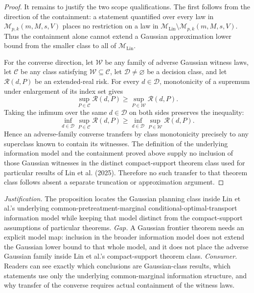\documentclass{article}
\begin{document}
\begin{proof}
It remains to justify the two scope qualifications.  The first follows
from the direction of the containment: a statement quantified over every
law in \(\mathcal M_{p,k}(m,M,s,V)\) places no restriction on a law in
\(\mathcal M_{\mathrm{Lin}}\setminus\mathcal M_{p,k}(m,M,s,V)\).
Thus the containment alone cannot extend a Gaussian approximation lower
bound from the smaller class to all of \(\mathcal M_{\mathrm{Lin}}\).

For the converse direction, let \(\mathcal W\) be any family of adverse
Gaussian witness laws, let \(\mathcal C\) be any class satisfying
\(\mathcal W\subseteq\mathcal C\), let \(\mathscr D\ne\varnothing\) be a
decision class, and let \(\mathcal R(d,P)\) be an extended-real risk.
For every \(d\in\mathscr D\), monotonicity of a supremum under enlargement
of its index set gives
\[
\sup_{P\in\mathcal C}\mathcal R(d,P)
\ge
\sup_{P\in\mathcal W}\mathcal R(d,P).
\]
Taking the infimum over the same \(d\in\mathscr D\) on both sides preserves
the inequality:
\[
\inf_{d\in\mathscr D}\sup_{P\in\mathcal C}\mathcal R(d,P)
\ge
\inf_{d\in\mathscr D}\sup_{P\in\mathcal W}\mathcal R(d,P).
\]
Hence an adverse-family converse transfers by class monotonicity precisely
to any superclass known to contain its witnesses.  The definition of the
underlying information model and the containment proved above supply no
inclusion of those Gaussian witnesses in the distinct compact-support
theorem class used for particular results of Lin et al. (2025).  Therefore
no such transfer to that theorem class follows absent a separate
truncation or approximation argument.
\end{proof}
\par\smallskip\noindent \textit{Justification.} The proposition locates the Gaussian planning class inside Lin et al.'s underlying common-pretreatment-marginal conditional-optimal-transport information model while keeping that model distinct from the compact-support assumptions of particular theorems. \textit{Gap.} A Gaussian frontier theorem needs an explicit model map: inclusion in the broader information model does not extend the Gaussian lower bound to that whole model, and it does not place the adverse Gaussian family inside Lin et al.'s compact-support theorem class. \textit{Consumer.} Readers can see exactly which conclusions are Gaussian-class results, which statements use only the underlying common-marginal information structure, and why transfer of the converse requires actual containment of the witness laws.
\end{document}
